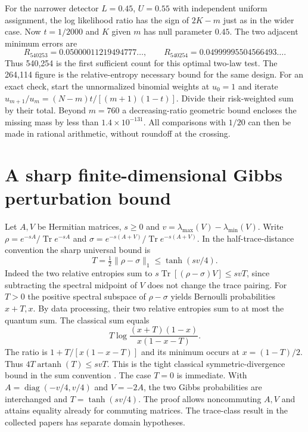 \documentclass[11pt,letterpaper]{article}
\newcommand{\tr}{\operatorname{Tr}}\newcommand{\ket}[1]{\lvert#1\rangle}\newcommand{\proj}[1]{\ket{#1}\!\langle#1\rvert}
\begin{document}
For the narrower detector $L=0.45$, $U=0.55$ with independent uniform assignment, the log likelihood ratio has the sign of $2K-m$ just as in the wider case. Now $t=1/2000$ and $K$ given $m$ has null parameter $0.45$. The two adjacent minimum errors are
\[
 R_{540253}=0.05000011219494777\ldots,\qquad
 R_{540254}=0.04999995504566493\ldots .
\]
Thus 540,254 is the first sufficient count for this optimal two-law test. The 264,114 figure is the relative-entropy necessary bound for the same design. For an exact check, start the unnormalized binomial weights at $u_0=1$ and iterate $u_{m+1}/u_m=(N-m)t/[(m+1)(1-t)]$. Divide their risk-weighted sum by their total. Beyond $m=760$ a decreasing-ratio geometric bound encloses the missing mass by less than $1.4\times10^{-131}$. All comparisons with $1/20$ can then be made in rational arithmetic, without roundoff at the crossing.

\section{A sharp finite-dimensional Gibbs perturbation bound}
Let $A,V$ be Hermitian matrices, $s\ge0$ and $v=\lambda_{\max}(V)-\lambda_{\min}(V)$. Write $\rho=e^{-sA}/\tr e^{-sA}$ and $\sigma=e^{-s(A+V)}/\tr e^{-s(A+V)}$. In the half-trace-distance convention the sharp universal bound is
\[
 T=\tfrac12\|\rho-\sigma\|_1\le\tanh(sv/4).
\]
Indeed the two relative entropies sum to $s\tr[(\rho-\sigma)V]\le svT$, since subtracting the spectral midpoint of $V$ does not change the trace pairing. For $T>0$ the positive spectral subspace of $\rho-\sigma$ yields Bernoulli probabilities $x+T,x$. By data processing, their two relative entropies sum to at most the quantum sum. The classical sum equals
\[
 T\log\frac{(x+T)(1-x)}{x(1-x-T)}.
\]
The ratio is $1+T/[x(1-x-T)]$ and its minimum occurs at $x=(1-T)/2$. Thus $4T\operatorname{artanh}(T)\le svT$. This is the tight classical symmetric-divergence bound in the sum convention \cite[Prop.~4]{sason}. The case $T=0$ is immediate. With $A=\operatorname{diag}(-v/4,v/4)$ and $V=-2A$, the two Gibbs probabilities are interchanged and $T=\tanh(sv/4)$. The proof allows noncommuting $A,V$ and attains equality already for commuting matrices. The trace-class result in the collected papers has separate domain hypotheses.
\end{document}
